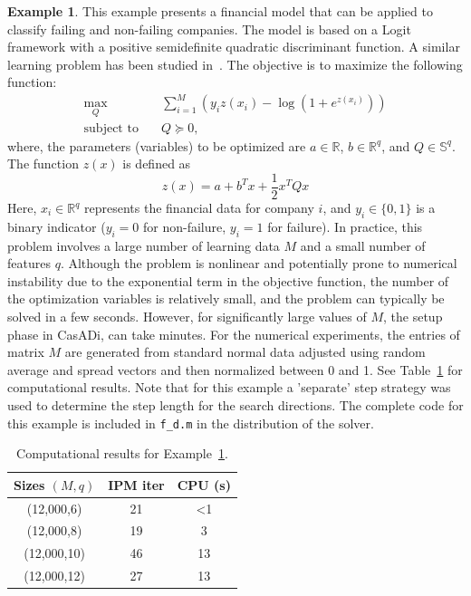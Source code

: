 \documentclass[]{interact}
\theoremstyle{plain}%
\theoremstyle{definition}
\newtheorem{example}[theorem]{Example}
\theoremstyle{remark}
\begin{document}
\begin{example}\label{eg:logistic_sdp}
This example presents a financial model that can be applied to classify failing and non-failing companies. The model is based on a Logit framework with a positive semidefinite quadratic discriminant function. A similar learning problem has been studied in~\cite{IPMSDP_2012}. The objective is to maximize the following function:
\begin{equation} \label{eq:logistic_sdp}
\begin{aligned}
\max_{Q} \quad & \sum_{i=1}^{M} \left( y_i z(x_i) - \log\left(1 + e^{z(x_i)}\right) \right) \\
\text{subject to} \quad & Q \succeq 0,
\end{aligned}
\end{equation}
where, the parameters (variables) to be optimized are \( a \in \mathbb{R} \), \( b \in \mathbb{R}^q \), and \( Q \in \mathbb{S}^q \). The function \( z(x) \) is defined as
\[
z(x) = a + b^T x + \frac{1}{2} x^T Q x
\]
Here, \( x_i \in \mathbb{R}^q \) represents the financial data for company \( i \), and \( y_i \in \{0, 1\} \) is a binary indicator (\( y_i = 0 \) for non-failure, \( y_i = 1 \) for failure). In practice, this problem involves a large number of learning data \( M \) and a small number of features \( q \). Although the problem is nonlinear and potentially prone to numerical instability due to the exponential term in the objective function, the number of the optimization variables is relatively small, and the problem can typically be solved in a few seconds. However, for significantly large values of \( M \), the setup phase in CasADi, can take minutes.  For the numerical experiments, the entries of matrix $M$ are generated from standard normal data adjusted using random average and spread vectors and then normalized between 0 and 1. See Table~\ref{tab:logistic_sdp} for computational results. Note that for this example a 'separate' step strategy was used to determine the step length for the search directions.  The complete code for this example is included in \texttt{f\_d.m} in the distribution of the solver.
\begin{table}
\centering
\caption{Computational results for Example~\ref{eg:logistic_sdp}.}
\begin{tabular}{ccc}
\toprule
Sizes $(M,q)$ & IPM iter & CPU (s) \\
\midrule
(12,000,6)  & 21 & <1 \\
(12,000,8)   & 19 & 3 \\
(12,000,10)   & 46 & 13 \\
(12,000,12)   & 27 & 13 \\
\bottomrule
\end{tabular}\label{tab:logistic_sdp}
\end{table}

\end{example}
\end{document}
